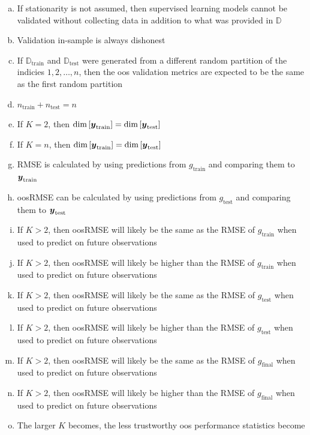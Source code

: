 \documentclass[12pt]{article}
\begin{document}
\begin{enumerate}[(a)]

\item If stationarity is not assumed, then supervised learning models cannot be validated without collecting data in addition to what was provided in $\mathbb{D}$
\item Validation in-sample is always dishonest

\item If $\mathbb{D}_{\text{train}}$ and $\mathbb{D}_{\text{test}}$ were generated from a different random partition of the indicies $1, 2, \ldots, n$, then the oos validation metrics are expected to be the same as the first random partition

\item  $n_{\text{train}} + n_{\text{test}}  = n$

\item If $K=2$, then $\text{dim}\left[\boldsymbol{y}_{\text{train}}\right] = \text{dim}\left[\boldsymbol{y}_{\text{test}}\right]$
\item If $K=n$, then $\text{dim}\left[\boldsymbol{y}_{\text{train}}\right] = \text{dim}\left[\boldsymbol{y}_{\text{test}}\right]$

\item RMSE is calculated by using predictions from $g_{\text{train}}$ and comparing them to $\boldsymbol{y}_{\text{train}}$
\item oosRMSE can be calculated by using predictions from $g_{\text{test}}$ and comparing them to $\boldsymbol{y}_{\text{test}}$

\item If $K > 2$, then oosRMSE will likely be the same as the RMSE of $g_{\text{train}}$ when used to predict on future observations
\item If $K > 2$, then oosRMSE will likely be higher than the RMSE of $g_{\text{train}}$ when used to predict on future observations

\item If $K > 2$, then oosRMSE will likely be the same as the RMSE of $g_{\text{test}}$ when used to predict on future observations
\item If $K > 2$, then oosRMSE will likely be higher than the RMSE of $g_{\text{test}}$ when used to predict on future observations

\item If $K > 2$, then oosRMSE will likely be the same as the RMSE of $g_{\text{final}}$ when used to predict on future observations
\item If $K > 2$, then oosRMSE will likely be higher than the RMSE of $g_{\text{final}}$ when used to predict on future observations

\item The larger $K$ becomes, the less trustworthy oos performance statistics become

\end{enumerate}
\eenum
\end{document}
